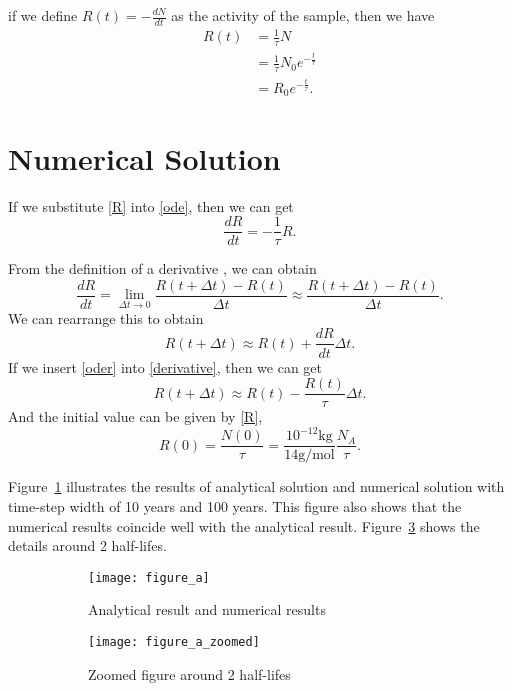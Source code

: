 \documentclass[a4paper]{article}
\begin{document}
	
	if we define $R(t) = - \frac{dN}{dt}$ as the activity of the sample, then we have
	\begin{align}
		R(t) & = \frac{1}{\tau}N \label{R} \\
			 & = \frac{1}{\tau} N_0 e^{-\frac{t}{\tau}} \\
			 & = R_0 e^{-\frac{t}{\tau}}.
	\end{align}

	\section{Numerical Solution}
	If we substitute \eqref{R} into \eqref{ode}, then we can get
	\begin{equation} \label{oder}
		\frac{dR}{dt} = - \frac{1}{\tau} R.
	\end{equation}
	
	
	From the definition of a derivative , we can obtain
	\begin{equation}
		\frac{dR}{dt	} = \lim_{\Delta t \to 0} \frac{R(t + \Delta t) - R(t)}{\Delta t} \approx \frac{R(t + \Delta t) - R(t)}{\Delta t}.
	\end{equation}
	We can rearrange this to obtain
	\begin{equation} \label{derivative}
		R(t + \Delta t) \approx R(t) + \frac{dR}{dt} \Delta t.
	\end{equation}
	If we insert \eqref{oder} into \eqref{derivative}, then we can get
	\begin{equation}
		R(t + \Delta t) \approx R(t) - \frac{R(t)}{\tau} \Delta t.
	\end{equation}
	And the initial value can be given by \eqref{R},
	\begin{equation}
		R(0) = \frac{N(0)}{\tau} = \frac{10^{-12}\mbox{kg}}{14\mbox{g/mol}} \frac{N_A}{\tau}.
	\end{equation}
	
	
	Figure~\ref{figure1} illustrates the results of analytical solution and numerical solution with time-step width of 10 years and 100 years. This figure also shows that the numerical results coincide well with the analytical result. Figure~\ref{figure2} shows the details around 2 half-lifes.
	\begin{figure}[H]
		\begin{subfigure}[b]{.5\textwidth}
			\centering
			\texttt{[image: figure\_a]}
			\caption{Analytical result and numerical results}
			\label{figure1}
		\end{subfigure}
		\begin{subfigure}[b]{.5\textwidth}
			\centering
			\texttt{[image: figure\_a\_zoomed]}
			\caption{Zoomed figure around 2 half-lifes}
			\label{figure2}
		\end{subfigure}
		\caption{}
	\end{figure}
	
\end{document}
